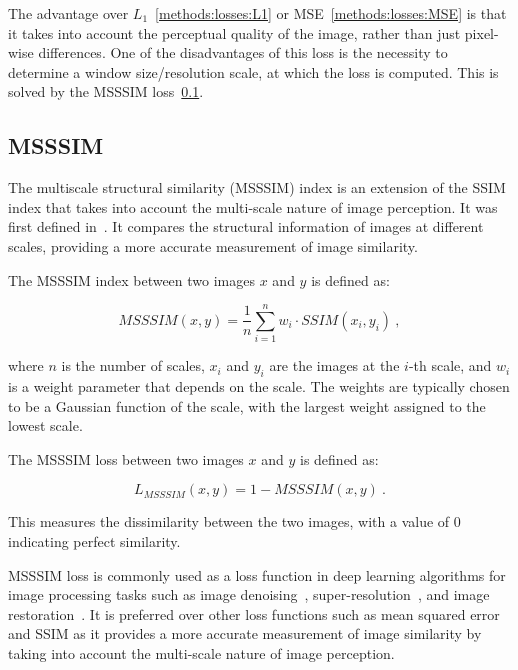 The advantage over $L_1$~\ref{methods:losses:L1} or MSE~\ref{methods:losses:MSE} is that it takes into account the perceptual quality of the image, rather than just pixel-wise differences.
One of the disadvantages of this loss is the necessity to determine a window size/resolution scale, at which the loss is computed. This is solved by the MSSSIM loss~\ref{methods:losses:MSSSIM}.


\subsection{MSSSIM}
\label{methods:losses:MSSSIM}
The multiscale structural similarity (MSSSIM) index is an extension of the SSIM index that takes into account the multi-scale nature of image perception. It was first defined in~\citep{wang2003multiscale}. It compares the structural information of images at different scales, providing a more accurate measurement of image similarity.

The MSSSIM index between two images $x$ and $y$ is defined as:

\begin{equation}
MSSSIM(x,y) = \frac{1}{n}\sum_{i=1}^{n} w_i \cdot SSIM(x_i, y_i)\:,
\end{equation}

where $n$ is the number of scales, $x_i$ and $y_i$ are the images at the $i$-th scale, and $w_i$ is a weight parameter that depends on the scale. The weights are typically chosen to be a Gaussian function of the scale, with the largest weight assigned to the lowest scale.

The MSSSIM loss between two images $x$ and $y$ is defined as:

\begin{equation}
L_{MSSSIM}(x,y) = 1 - MSSSIM(x,y)\:.
\end{equation}

This measures the dissimilarity between the two images, with a value of 0 indicating perfect similarity.

MSSSIM loss is commonly used as a loss function in deep learning algorithms for image processing tasks such as image denoising~\citep{bera2019lightweight}, super-resolution~\citep{min2023d}, and image restoration~\citep{zhao2016loss}. It is preferred over other loss functions such as mean squared error and SSIM as it provides a more accurate measurement of image similarity by taking into account the multi-scale nature of image perception.


